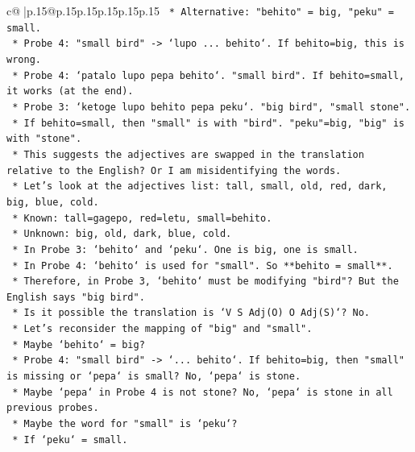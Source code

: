 \documentclass{article}
\begin{document}
{\begin{supertabular}{c@{$\;$}|p{.15\linewidth}@{}p{.15\linewidth}p{.15\linewidth}p{.15\linewidth}p{.15\linewidth}p{.15\linewidth}}
{{{\texttt{            *   Alternative: "behito" = big, "peku" = small.} \\
\texttt{                *   Probe 4: "small bird" {-}> `lupo ... behito`. If behito=big, this is wrong.} \\
\texttt{                *   Probe 4: `patalo lupo pepa behito`. "small bird". If behito=small, it works (at the end).} \\
\texttt{                *   Probe 3: `ketoge lupo behito pepa peku`. "big bird", "small stone".} \\
\texttt{                *   If behito=small, then "small" is with "bird". "peku"=big, "big" is with "stone".} \\
\texttt{                *   This suggests the adjectives are swapped in the translation relative to the English? Or I am misidentifying the words.} \\
\texttt{                *   Let's look at the adjectives list: tall, small, old, red, dark, big, blue, cold.} \\
\texttt{                *   Known: tall=gagepo, red=letu, small=behito.} \\
\texttt{                *   Unknown: big, old, dark, blue, cold.} \\
\texttt{                *   In Probe 3: `behito` and `peku`. One is big, one is small.} \\
\texttt{                *   In Probe 4: `behito` is used for "small". So **behito = small**.} \\
\texttt{                *   Therefore, in Probe 3, `behito` must be modifying "bird"? But the English says "big bird".} \\
\texttt{                *   Is it possible the translation is `V S Adj(O) O Adj(S)`? No.} \\
\texttt{                *   Let's reconsider the mapping of "big" and "small".} \\
\texttt{                *   Maybe `behito` = big?} \\
\texttt{                    *   Probe 4: "small bird" {-}> `... behito`. If behito=big, then "small" is missing or `pepa` is small? No, `pepa` is stone.} \\
\texttt{                    *   Maybe `pepa` in Probe 4 is not stone? No, `pepa` is stone in all previous probes.} \\
\texttt{                    *   Maybe the word for "small" is `peku`?} \\
\texttt{                    *   If `peku` = small.} \\
}}}
\end{supertabular}}
\end{document}
